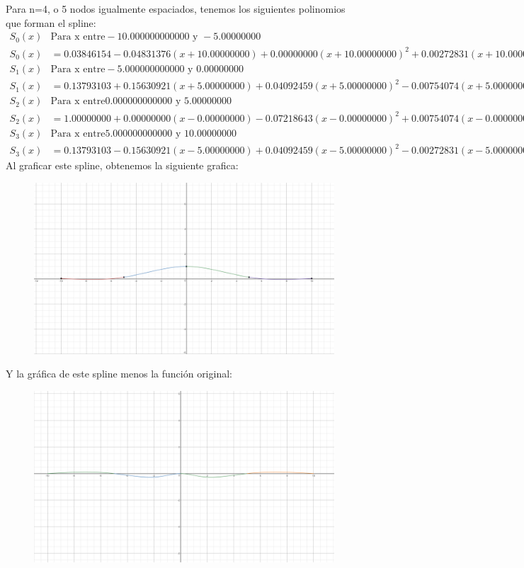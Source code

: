 
Para n=4, o 5 nodos igualmente espaciados, tenemos los siguientes polinomios que forman el spline:
\begin{align*}
S_0(x) & \text{Para x entre} -10.000000000000 \text{ y } -5.00000000 \\
S_0(x) & = 0.03846154-0.04831376(x+10.00000000)+0.00000000(x+10.00000000)^2+0.00272831(x+10.00000000)^3 \\
S_1(x) & \text{Para x entre} -5.000000000000 \text{ y } 0.00000000 \\
S_1(x) & = 0.13793103+0.15630921(x+5.00000000)+0.04092459(x+5.00000000)^2-0.00754074(x+5.00000000)^3 \\
S_2(x) & \text{Para x entre} 0.000000000000 \text{ y } 5.00000000 \\
S_2(x) & = 1.00000000+0.00000000(x-0.00000000)-0.07218643(x-0.00000000)^2+0.00754074(x-0.00000000)^3 \\
S_3(x) & \text{Para x entre} 5.000000000000 \text{ y } 10.00000000 \\
S_3(x) & = 0.13793103-0.15630921(x-5.00000000)+0.04092459(x-5.00000000)^2-0.00272831(x-5.00000000)^3
\end{align*}
Al graficar este spline, obtenemos la siguiente grafica:
\begin{figure}[H]
	\centering
	\includegraphics[scale=0.2]{img/2_4.png}
\end{figure}
Y la gráfica de este spline menos la función original:
\begin{figure}[H]
	\centering
	\includegraphics[scale=0.2]{img/2_4dif.png}
\end{figure}


